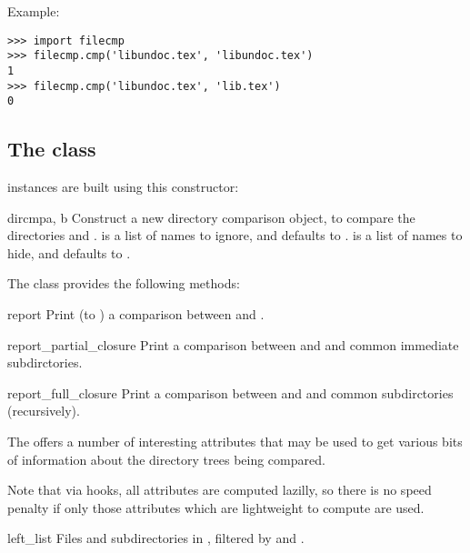 Example:

\begin{verbatim}
>>> import filecmp
>>> filecmp.cmp('libundoc.tex', 'libundoc.tex')
1
>>> filecmp.cmp('libundoc.tex', 'lib.tex')
0
\end{verbatim}


\subsection{The \protect{} class \label{dircmp-objects}}

 instances are built using this constructor:

\begin{classdesc}{dircmp}{a, b}
Construct a new directory comparison object, to compare the
directories  and .  is a list of names to
ignore, and defaults to .  is a
list of names to hide, and defaults to .
\end{classdesc}

The  class provides the following methods:

\begin{methoddesc}[dircmp]{report}{}
Print (to ) a comparison between  and .
\end{methoddesc}

\begin{methoddesc}[dircmp]{report_partial_closure}{}
Print a comparison between  and  and common immediate
subdirctories.
\end{methoddesc}

\begin{methoddesc}[dircmp]{report_full_closure}{}
Print a comparison between  and  and common 
subdirctories (recursively).
\end{methoddesc}


The  offers a number of interesting attributes that may
be used to get various bits of information about the directory trees
being compared.

Note that via  hooks, all attributes are
computed lazilly, so there is no speed penalty if only those
attributes which are lightweight to compute are used.

\begin{memberdesc}[dircmp]{left_list}
Files and subdirectories in , filtered by  and
.
\end{memberdesc}


